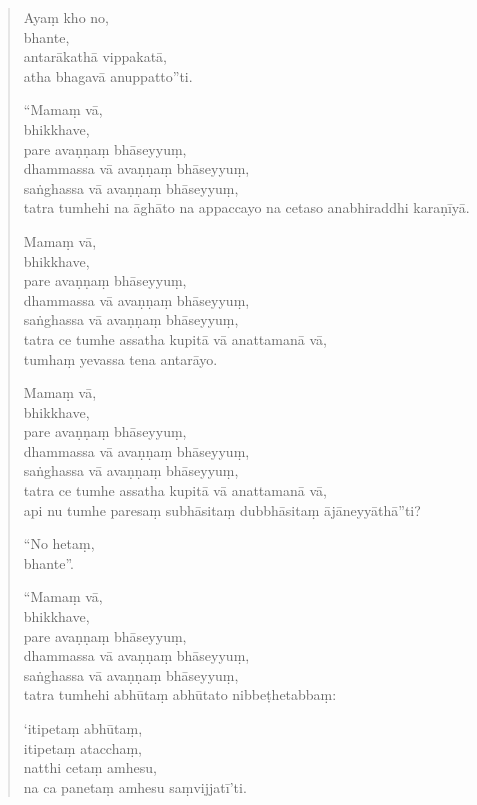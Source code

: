 \documentclass[11pt,twoside,openright]{book}
\begin{document}
\begin{verse}
Ayaṃ kho no,\\
\vin  bhante,\\
\vin  antarākathā vippakatā,\\
\vin  atha bhagavā anuppatto”ti.

“Mamaṃ vā,\\
\vin  bhikkhave,\\
\vin  pare avaṇṇaṃ bhāseyyuṃ,\\
\vin  dhammassa vā avaṇṇaṃ bhāseyyuṃ,\\
\vin  saṅghassa vā avaṇṇaṃ bhāseyyuṃ,\\
\vin  tatra tumhehi na āghāto na appaccayo na cetaso anabhiraddhi karaṇīyā.

Mamaṃ vā,\\
\vin  bhikkhave,\\
\vin  pare avaṇṇaṃ bhāseyyuṃ,\\
\vin  dhammassa vā avaṇṇaṃ bhāseyyuṃ,\\
\vin  saṅghassa vā avaṇṇaṃ bhāseyyuṃ,\\
\vin  tatra ce tumhe assatha kupitā vā anattamanā vā,\\
\vin  tumhaṃ yevassa tena antarāyo.

Mamaṃ vā,\\
\vin  bhikkhave,\\
\vin  pare avaṇṇaṃ bhāseyyuṃ,\\
\vin  dhammassa vā avaṇṇaṃ bhāseyyuṃ,\\
\vin  saṅghassa vā avaṇṇaṃ bhāseyyuṃ,\\
\vin  tatra ce tumhe assatha kupitā vā anattamanā vā,\\
\vin  api nu tumhe paresaṃ subhāsitaṃ dubbhāsitaṃ ājāneyyāthā”ti?

“No hetaṃ,\\
\vin  bhante”.

“Mamaṃ vā,\\
\vin  bhikkhave,\\
\vin  pare avaṇṇaṃ bhāseyyuṃ,\\
\vin  dhammassa vā avaṇṇaṃ bhāseyyuṃ,\\
\vin  saṅghassa vā avaṇṇaṃ bhāseyyuṃ,\\
\vin  tatra tumhehi abhūtaṃ abhūtato nibbeṭhetabbaṃ:

‘itipetaṃ abhūtaṃ,\\
\vin  itipetaṃ atacchaṃ,\\
\vin  natthi cetaṃ amhesu,\\
\vin  na ca panetaṃ amhesu saṃvijjatī’ti.


\end{verse}
\end{document}
